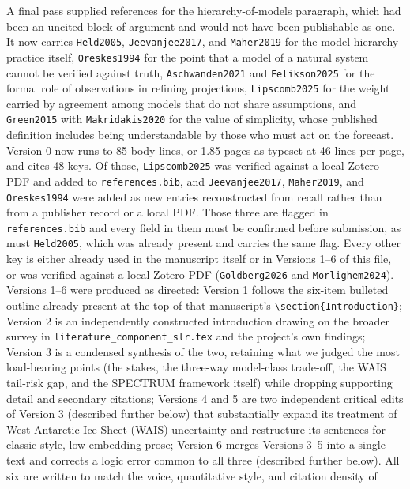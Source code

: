 \documentclass[12pt]{article}
\begin{document}
\noindent A final pass supplied references for the hierarchy-of-models
paragraph, which had been an uncited block of argument and would not have been
publishable as one. It now carries \texttt{Held2005}, \texttt{Jeevanjee2017},
and \texttt{Maher2019} for the model-hierarchy practice itself,
\texttt{Oreskes1994} for the point that a model of a natural system cannot be
verified against truth, \texttt{Aschwanden2021} and \texttt{Felikson2025} for
the formal role of observations in refining projections, \texttt{Lipscomb2025}
for the weight carried by agreement among models that do not share assumptions,
and \texttt{Green2015} with \texttt{Makridakis2020} for the value of simplicity,
whose published definition includes being understandable by those who must act
on the forecast. Version 0 now runs to 85 body lines, or 1.85 pages as typeset
at 46 lines per page, and cites 48 keys. Of those, \texttt{Lipscomb2025} was
verified against a local Zotero PDF and added to \texttt{references.bib}, and
\texttt{Jeevanjee2017}, \texttt{Maher2019}, and \texttt{Oreskes1994} were added
as new entries reconstructed from recall rather than from a publisher record or
a local PDF. Those three are flagged in \texttt{references.bib} and every field
in them must be confirmed before submission, as must \texttt{Held2005}, which
was already present and carries the same flag. Every other key is either
already used in the manuscript itself or in Versions 1--6 of this file, or was
verified against a local Zotero PDF (\texttt{Goldberg2026} and
\texttt{Morlighem2024}).
Versions 1--6 were produced as directed:
Version 1 follows the six-item bulleted outline already present at the top
of that manuscript's \texttt{\textbackslash section\{Introduction\}}; Version
2 is an independently constructed introduction drawing on the broader
survey in \texttt{literature\_component\_slr.tex} and the project's own
findings; Version 3 is a condensed synthesis of the two, retaining what we
judged the most load-bearing points (the stakes, the three-way model-class
trade-off, the WAIS tail-risk gap, and the SPECTRUM framework itself)
while dropping supporting detail and secondary citations; Versions 4 and 5
are two independent critical edits of Version 3 (described further below)
that substantially expand its treatment of West Antarctic Ice Sheet (WAIS)
uncertainty and restructure its sentences for classic-style, low-embedding
prose; Version 6 merges Versions 3--5 into a single text and corrects a
logic error common to all three (described further below). All six are
written to match the voice, quantitative style, and citation density of
\end{document}
